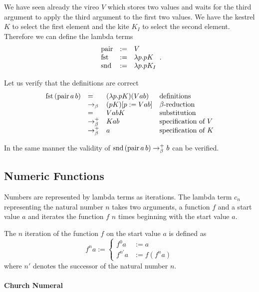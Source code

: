 We have seen already the vireo $V$ which stores two values and waits for the
third argument to apply the third argument to the first two values. We have
the kestrel $K$ to select the first element and the kite $K_I$ to select the
second element. Therefore we can define the lambda terms
$$
\begin{array}{lll}
  \text{pair} & := & V \\
  \text{fst}   & := &\lambda p. p K \\
  \text{snd}  & := &\lambda p. p K_I \\
\end{array}.
$$

Let us verify that the definitions are correct
$$
\begin{array}{llll}
  \text{fst}\, (\text{pair}\, a\, b)  &=& (\lambda p. p K) (V a b)  & \text{definitions} \\
  & \to_\beta & (pK)[p:=V a b]      &\beta\text{-reduction}\\
  & = & V a b K & \text{substitution} \\
  & \to^+_\beta & K a b  &\text{specification of } V \\
  & \to^+_\beta & a & \text{specification of } K
\end{array}
$$

In the same manner the validity of $\text{snd}\,(\text{pair}\, a\, b) \to^+_\beta b$ can
be verified.



\subsection{Numeric Functions}

Numbers are represented by lambda terms as iterations. The lambda term $c_n$
representing the natural number $n$ takes two arguments, a function $f$ and a
start value $a$ and iterates the function $f$ $n$ times beginning with the
start value $a$.

\begin{definition}
The $n$ iteration of the function $f$ on the start value $a$ is defined as
$$
f^n a :=
\begin{cases}
  f^0 a &:= a\\
  f^{n'} a & := f (f^n a)
\end{cases}
$$
where $n'$ denotes the successor of the natural number $n$.
\end{definition}


\paragraph{Church Numeral}

